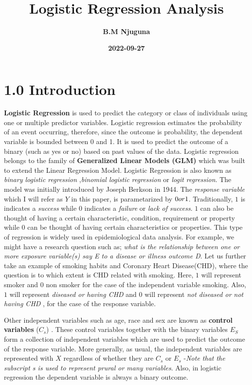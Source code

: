 \documentclass[
]{article}
\title{\textbf{Logistic Regression Analysis}}
\author{\textbf{B.M Njuguna}}
\date{\textbf{2022-09-27}}
\begin{document}
\maketitle

\newpage 
\tableofcontents
\newpage

\hypertarget{introduction}{%
\section{1.0 Introduction}\label{introduction}}

\textbf{Logistic Regression} is used to predict the category or class of
individuals using one or multiple predictor variables. Logistic
regression estimates the probability of an event occurring, therefore,
since the outcome is probability, the dependent variable is bounded
between 0 and 1. It is used to predict the outcome of a binary (such as
yes or no) based on past values of the data. Logistic regression belongs
to the family of \textbf{Generalized Linear Models (GLM)} which was
built to extend the Linear Regression Model. Logistic Regression is also
known as \emph{binary logistic regression} ,\emph{binomial logistic
regression} or \emph{logit regression}. The model was initially
introduced by Joseph Berkson in 1944. The \emph{response variable} which
I will refer as \(Y\) in this paper, is parametarized by
\(0\space or\space 1\). Traditionally, \(1\) is indicates a
\emph{success} while \(0\) indicates a \emph{failure} or \emph{lack of
success}. \(1\) can also be thought of having a certain characteristic,
condition, requirement or property while \(0\) can be thought of having
certain characteristics or properties. This type of regression is widely
used in epidemiological data analysis. For example, we might have a
research question such as; \emph{what is the relationship between one or
more exposure variable(s) say E to a disease or illness outcome D}. Let
us further take an example of smoking habits and Coronary Heart
Disease(CHD), where the question is to which extent is CHD related with
smoking. Here, \(1\) will represent smoker and \(0\) non smoker for the
case of the independent variable smoking. Also, \(1\) will represent
\emph{diseased or having CHD} and \(0\) will represent \emph{not
diseased or not having CHD} , for the case of the response variable.

Other independent variables such as age, race and sex are known as
\textbf{control variables} (\(C_s\)) . These control variables together
with the binary variables \(E_S\) form a collection of independent
variables which are used to predict the outcome of the response
variable. More generally, as usual, the independent variables are
represented with \(X\) regardless of whether they are \(C_s\) or \(E_s\)
-\emph{Note that the subscript s is used to represent prural or many
variables}. Also, in logistic regression the dependent variable is
always a binary outcome.
\end{document}
